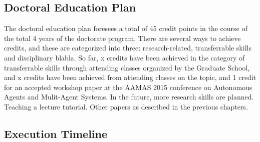 \subsection{Doctoral Education Plan}
The doctoral education plan foresees a total of 45 credit points in the course of the total 4 years of the doctorate program. There are several ways to achieve credits, and these are categorized into three: research-related, transferrable skills and disciplinary blabla. So far, x credits have been achieved in the category of transferrable skills through attending classes organized by the Graduate School, and x credits have been achieved from attending classes on the topic, and 1 credit for an accepted workshop paper at the AAMAS 2015 conference on Autonomous Agents and Mulit-Agent Systems.
In the future, more research skills are planned.
Teaching a lecture tutorial.
Other papers as described in the previous chapters.

  
\subsection{Execution Timeline}  
  
  
  
  